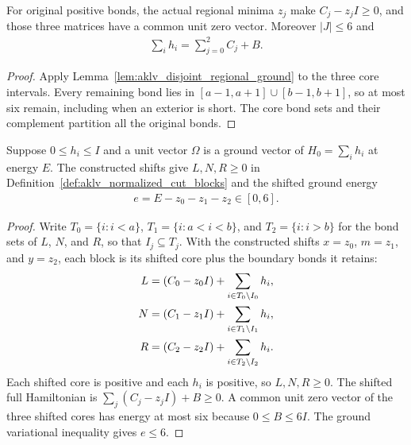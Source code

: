 \begin{lemma}
    \label{lem:aklv_constructed_regional_shifts}
    \leanok
    For original positive bonds, the actual regional minima $z_j$ make
    $C_j-z_jI\ge0$, and those three matrices have a common unit zero vector.
    Moreover $|J|\le6$ and
    \begin{align}
        \sum_i h_i=\sum_{j=0}^2 C_j+B.
    \end{align}
\end{lemma}
\begin{proof}
    \leanok
    Apply Lemma~\ref{lem:aklv_disjoint_regional_ground} to the three core
    intervals. Every remaining bond lies in
    $[a-1,a+1]\cup[b-1,b+1]$, so at most six remain, including when an
    exterior is short. The core bond sets and their complement partition
    all the original bonds.
\end{proof}

\begin{lemma}
    \label{lem:aklv_original_normalization_data}
    \leanok
    Suppose $0\le h_i\le I$ and a unit vector $\Omega$ is a ground vector
    of $H_0=\sum_i h_i$ at energy $E$. The constructed shifts give
    $L,N,R\ge0$ in Definition~\ref{def:aklv_normalized_cut_blocks} and
    the shifted ground energy
    \begin{align}
        e=E-z_0-z_1-z_2\in[0,6].
    \end{align}
\end{lemma}
\begin{proof}
    \leanok
    Write $T_0=\{i:i<a\}$, $T_1=\{i:a<i<b\}$, and $T_2=\{i:i>b\}$ for the
    bond sets of $L$, $N$, and $R$, so that $I_j\subseteq T_j$. With the
    constructed shifts $x=z_0$, $m=z_1$, and $y=z_2$, each block is its
    shifted core plus the boundary bonds it retains:
    \begin{align}
        L & =(C_0-z_0I)+\sum_{i\in T_0\setminus I_0}h_i,\notag \\
        N & =(C_1-z_1I)+\sum_{i\in T_1\setminus I_1}h_i,\notag \\
        R & =(C_2-z_2I)+\sum_{i\in T_2\setminus I_2}h_i.
    \end{align}
    Each shifted core is positive and each $h_i$ is positive, so
    $L,N,R\ge0$. The shifted full Hamiltonian is
    $\sum_j(C_j-z_jI)+B\ge0$. A common unit zero vector of the three
    shifted cores has energy at most six because $0\le B\le6I$.
    The ground variational inequality gives $e\le6$.
\end{proof}

